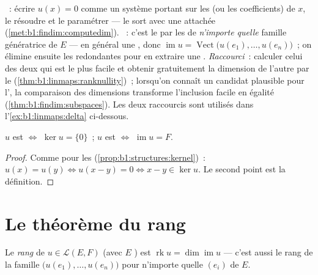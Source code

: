\begin{method}
\label{met:b1:linmaps:kerim}
\emph{}~: écrire $u(x) = 0$ comme un système portant sur les
 (ou les coefficients) de $x$, le résoudre et le
paramétrer --- le  sort avec une  attachée
(\cref{met:b1:findim:computedim}). \emph{}~: c'est le
 par les  de \emph{n'importe quelle} famille
génératrice de $E$ --- en général une , donc $\operatorname{im} u =
\operatorname{Vect}\bigl(u(e_1), \dots, u(e_n)\bigr)$~; on élimine
ensuite les  redondantes pour en extraire une . \emph{Raccourci}~:
calculer celui des deux qui est le plus facile et obtenir gratuitement la
dimension de l'autre par le 
(\cref{thm:b1:linmaps:ranknullity})~; lorsqu'on connaît un
 candidat plausible pour l', la comparaison des dimensions
transforme l'inclusion facile en égalité
(\cref{thm:b1:findim:subspaces}). Les deux raccourcis sont utilisés dans
l'\cref{ex:b1:linmaps:delta} ci-dessous.
\end{method}

\begin{proposition}\label{prop:b1:linmaps:kernel}
$u$ est  $\iff$ $\ker u = \{0\}$~; $u$ est  $\iff$
$\operatorname{im} u = F$.
\end{proposition}

\begin{proof}
Comme pour les  (\cref{prop:b1:structures:kernel})~: $u(x) = u(y) \iff
u(x - y) = 0 \iff x - y \in \ker u$. Le second point est la
définition.
\end{proof}

\section{Le théorème du rang}

\begin{definition}\label{def:b1:linmaps:rank}
Le \emph{rang} de $u \in \mathcal{L}(E,
F)$ (avec $E$ ) est $\operatorname{rk} u = \dim
\operatorname{im} u$ --- c'est aussi le rang de la famille
$\bigl(u(e_1), \dots, u(e_n)\bigr)$ pour n'importe quelle  $(e_i)$ de $E$.
\end{definition}

